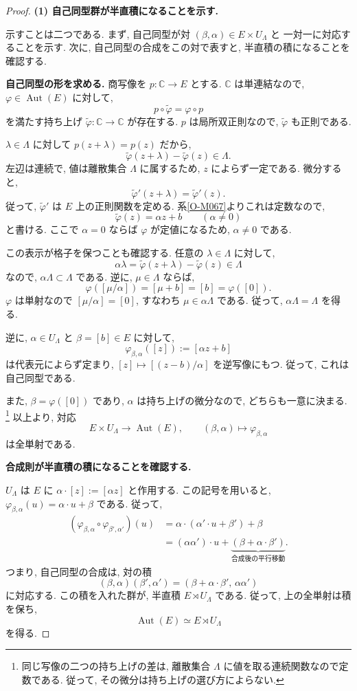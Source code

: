 \documentclass[dvipdfmx,a4paper,11pt]{article} %
\newcommand{\C}{\mathbb{C}}
\theoremstyle{definition}
\numberwithin{equation}{section}
\begin{document}
\begin{proof}
\textbf{(1) 自己同型群が半直積になることを示す.}

示すことは二つである.
まず, 自己同型が対 $(\beta,\alpha)\in E\times U_\Lambda$ と
一対一に対応することを示す.
次に, 自己同型の合成をこの対で表すと,
半直積の積になることを確認する.

\medskip
\noindent
\textbf{自己同型の形を求める.}
商写像を $p:\C\to E$ とする.
$\C$ は単連結なので,
$\varphi\in\operatorname{Aut}(E)$ に対して,
\[
p\circ\widetilde\varphi=\varphi\circ p
\]
を満たす持ち上げ $\widetilde\varphi:\C\to\C$ が存在する.
$p$ は局所双正則なので, $\widetilde\varphi$ も正則である.

$\lambda\in\Lambda$ に対して $p(z+\lambda)=p(z)$ だから,
\[
\widetilde\varphi(z+\lambda)-\widetilde\varphi(z)\in\Lambda.
\]
左辺は連続で, 値は離散集合 $\Lambda$ に属するため,
$z$ によらず一定である.
微分すると,
\[
\widetilde\varphi'(z+\lambda)=\widetilde\varphi'(z).
\]
従って, $\widetilde\varphi'$ は $E$ 上の正則関数を定める.
系\ref{O-M067}よりこれは定数なので,
\[
\widetilde\varphi(z)=\alpha z+b
\qquad(\alpha\neq0)
\]
と書ける.
ここで $\alpha=0$ ならば $\varphi$ が定値になるため,
$\alpha\neq0$ である.

この表示が格子を保つことも確認する.
任意の $\lambda\in\Lambda$ に対して,
\[
\alpha\lambda
=\widetilde\varphi(z+\lambda)-\widetilde\varphi(z)\in\Lambda
\]
なので, $\alpha\Lambda\subset\Lambda$ である.
逆に, $\mu\in\Lambda$ ならば,
\[
\varphi([\mu/\alpha])=[\mu+b]=[b]=\varphi([0]).
\]
$\varphi$ は単射なので $[\mu/\alpha]=[0]$,
すなわち $\mu\in\alpha\Lambda$ である.
従って, $\alpha\Lambda=\Lambda$ を得る.

逆に, $\alpha\in U_\Lambda$ と $\beta=[b]\in E$ に対して,
\[
\varphi_{\beta,\alpha}([z]):=[\alpha z+b]
\]
は代表元によらず定まり,
$[z]\mapsto[(z-b)/\alpha]$ を逆写像にもつ.
従って, これは自己同型である.

また, $\beta=\varphi([0])$ であり,
$\alpha$ は持ち上げの微分なので, どちらも一意に決まる.
\footnote{
同じ写像の二つの持ち上げの差は,
離散集合 $\Lambda$ に値を取る連続関数なので定数である.
従って, その微分は持ち上げの選び方によらない.
}
以上より, 対応
\[
E\times U_\Lambda\longrightarrow\operatorname{Aut}(E),
\qquad
(\beta,\alpha)\longmapsto\varphi_{\beta,\alpha}
\]
は全単射である.

\medskip
\noindent
\textbf{合成則が半直積の積になることを確認する.}

$U_\Lambda$ は $E$ に
$\alpha\cdot[z]:=[\alpha z]$ と作用する.
この記号を用いると,
$\varphi_{\beta,\alpha}(u)=\alpha\cdot u+\beta$ である.
従って,
\[
\begin{aligned}
(\varphi_{\beta,\alpha}\circ\varphi_{\beta',\alpha'})(u)
&=\alpha\cdot(\alpha'\cdot u+\beta')+\beta\\
&=(\alpha\alpha')\cdot u
+\underbrace{(\beta+\alpha\cdot\beta')}_{\text{合成後の平行移動}}.
\end{aligned}
\]
つまり, 自己同型の合成は, 対の積
\[
(\beta,\alpha)(\beta',\alpha')
=(\beta+\alpha\cdot\beta',\,\alpha\alpha')
\]
に対応する.
この積を入れた群が, 半直積 $E\rtimes U_\Lambda$ である.
従って, 上の全単射は積を保ち,
\[
\operatorname{Aut}(E)\simeq E\rtimes U_\Lambda
\]
を得る.


\end{proof}
\end{document}
